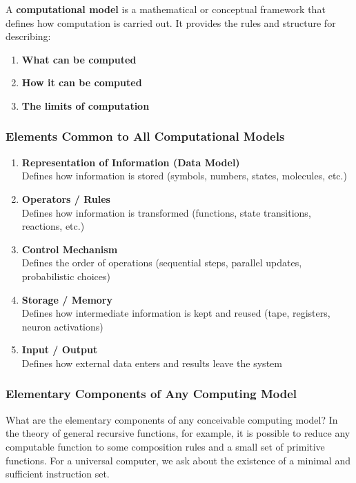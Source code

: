 A \textbf{computational model} is a mathematical or conceptual framework that defines how computation is carried out. It provides the rules and structure for describing:

\begin{enumerate}
\item \textbf{What can be computed}
\item \textbf{How it can be computed}
\item \textbf{The limits of computation}
\end{enumerate}

\subsubsection{Elements Common to All Computational Models}
\label{subsubsec:elements-computational-models}

\begin{enumerate}
\item \textbf{Representation of Information (Data Model)}\\
   Defines how information is stored (symbols, numbers, states, molecules, etc.)

\item \textbf{Operators / Rules}\\
   Defines how information is transformed (functions, state transitions, reactions, etc.)

\item \textbf{Control Mechanism}\\
   Defines the order of operations (sequential steps, parallel updates, probabilistic choices)

\item \textbf{Storage / Memory}\\
   Defines how intermediate information is kept and reused (tape, registers, neuron activations)

\item \textbf{Input / Output}\\
   Defines how external data enters and results leave the system
\end{enumerate}

\subsubsection{Elementary Components of Any Computing Model}
\label{subsubsec:elementary-components}

What are the elementary components of any conceivable computing model? In the theory of general recursive functions, for example, it is possible to reduce any computable function to some composition rules and a small set of primitive functions. For a universal computer, we ask about the existence of a minimal and sufficient instruction set.

